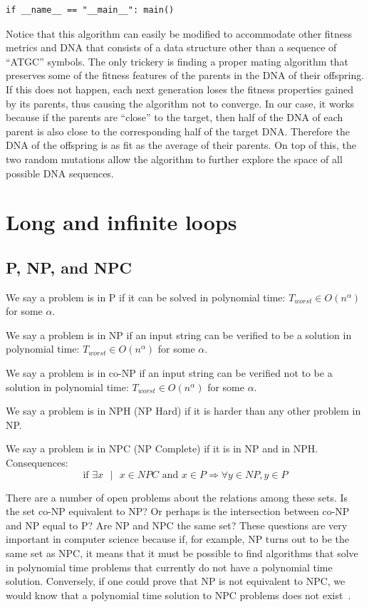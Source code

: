 \documentclass[justified, sixbynine]{tufte-book}
\theoremstyle{plain}%
\newtheorem * {corollary}{Corollary}
\theoremstyle{definition}
\theoremstyle{remark}
\newtheorem * {remark}{Remark}
\newtheorem * {note}{Note}
\begin{document}
\begin{fullwidth}
\begin{lstlisting}
if __name__ == "__main__": main()
\end{lstlisting}

Notice that this algorithm can easily be modified to accommodate other fitness metrics and DNA that consists of a data structure other than a sequence of ``ATGC'' symbols. The only trickery is finding a proper mating algorithm that preserves some of the fitness features of the parents in the DNA of their offspring. If this does not happen, each next generation loses the fitness properties gained by its parents, thus causing the algorithm not to converge. In our case, it works because if the parents are ``close'' to the target, then half of the DNA of each parent is also close to the corresponding half of the target DNA. Therefore the DNA of the offspring is as fit as the average of their parents. On top of this, the two random mutations allow the algorithm to further explore the space of all possible DNA sequences.

\goodbreak\section{Long and infinite loops}
\goodbreak\subsection{P, NP, and NPC}

We say a problem is in P if it can be solved in polynomial time: $%
T_{worst}\in O(n^\alpha )$ for some $\alpha $.

We say a problem is in NP if an input string can be verified to be a
solution in polynomial time: $T_{worst}\in O(n^\alpha )$ for some $\alpha $.

We say a problem is in co-NP if an input string can be verified not to be a
solution in polynomial time: $T_{worst}\in O(n^\alpha )$ for some $\alpha $.

We say a problem is in NPH (NP Hard) if it is harder than any other problem
in NP.

We say a problem is in NPC (NP Complete) if it is in NP and in NPH.
Consequences:
\begin{equation}
\text{if }\exists x\text{ }|\text{ }x\in NPC\text{ and }x\in P\Rightarrow
\forall y\in NP, y\in P
\end{equation}

There are a number of open problems about the relations among these sets.
Is the set co-NP equivalent to NP? Or perhaps is the intersection between co-NP and NP equal to P?
Are NP and NPC the same set? These questions are very important in computer science because if, for example, NP turns out to be the same set as NPC, it means that it must be possible to find algorithms that solve in polynomial time problems that currently do not have a polynomial time solution. Conversely, if one could prove that NP is not equivalent to NPC, we would know that a polynomial time solution to NPC problems does not exist~\cite{pnp}.


\end{fullwidth}
\end{document}
